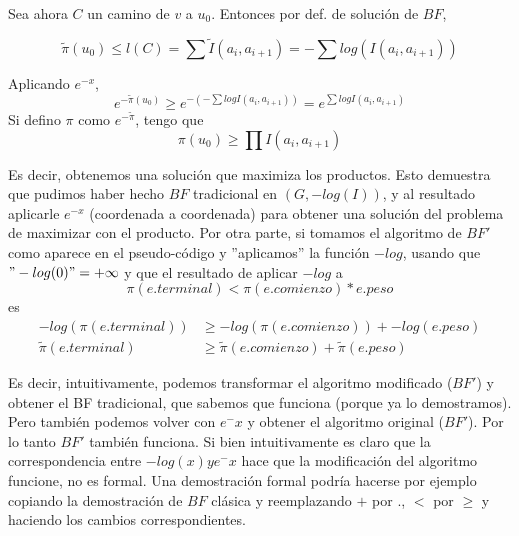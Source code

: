 Sea ahora $C$ un camino de $v$ a $u_0$. Entonces por def. de solución de $BF$,

$$ \tilde{\pi}(u_0) \leq l(C) = \sum \tilde{I} (a_i, a_{i+1}) = - \sum log(I(a_i, a_{i+1}))$$

Aplicando $e^{-x}$,
$$ e^{-\tilde{\pi}(u_0)} \geq e^{ - ( - \sum logI(a_i, a_{i+1}) )} = e^{ \sum logI(a_i, a_{i+1})}$$
Si defino $\pi$ como $e^{-\tilde{\pi}}$, tengo que
$$\pi (u_0) \geq \prod I(a_i , a_{i+1})$$

Es decir, obtenemos una solución que maximiza los productos. Esto demuestra que pudimos haber hecho $BF$ tradicional en $(G, -log(I))$, y al resultado aplicarle $e^{-x}$ (coordenada a coordenada) para obtener una solución del problema de maximizar con el producto. Por otra parte, si tomamos el algoritmo de $BF'$ como aparece en el pseudo-código y ''aplicamos'' la función $-log$, usando que $"-log(0)" = +\infty$ y que el resultado de aplicar $-log$ a 
$$\pi(e.terminal) < \pi(e.comienzo) * e.peso$$
es
\begin{align}
    -log(\pi(e.terminal)) &\geq -log(\pi(e.comienzo)) + - log( e.peso) \\        
    \tilde{\pi}(e.terminal) &\geq \tilde{\pi}(e.comienzo) + \tilde{\pi}(e.peso)
\end{align}

Es decir, intuitivamente, podemos transformar el algoritmo modificado ($BF'$) y obtener el BF tradicional, que sabemos que funciona (porque ya lo demostramos). Pero también podemos volver con $e^-x$ y obtener el algoritmo original ($BF'$). Por lo tanto $BF'$ también funciona. Si bien intuitivamente es claro que la correspondencia entre $-log(x) y e^-x$ hace que la modificación del algoritmo funcione, no es formal. Una demostración formal podría hacerse por ejemplo copiando la demostración de $BF$ clásica y reemplazando $+$ por $.$, $<$ por $\geq$ y haciendo los cambios correspondientes.